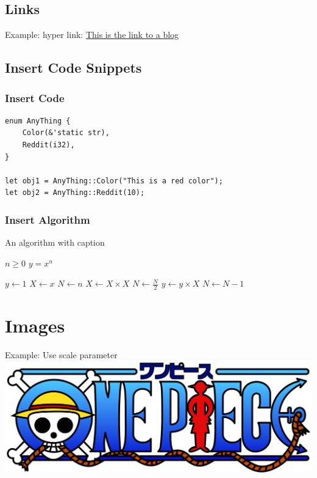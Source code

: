\documentclass[letterpaper, oneside]{book}
\begin{document}
	\section{Links}

	Example: hyper link:  \href{https://news.ycombinator.com/news}{This is the link to a blog}

\section{Insert Code Snippets}

\subsection{Insert Code}

\begin{lstlisting}
enum AnyThing {
    Color(&'static str),
    Reddit(i32),
}

let obj1 = AnyThing::Color("This is a red color");
let obj2 = AnyThing::Reddit(10);

\end{lstlisting}

\subsection{Insert Algorithm}

\begin{algorithm}
	\caption{An algorithm with caption}\label{alg:cap}

	\begin{algorithmic}[1]
		\Require $n \geq 0$
		\Ensure $y = x^n$

		\State $y \gets 1$
		\State $X \gets x$
		\State $N \gets n$
		\State $X \gets X \times X$
		\State $N \gets \frac{N}{2}$  
		\State $y \gets y \times X$
		\State $N \gets N - 1$
		\EndIf
		\EndWhile


	\end{algorithmic}
\end{algorithm}



	\chapter{Images}
	Example: Use scale parameter \\
	\includegraphics[scale=0.6]{One_Piece_Logo.png}
\end{document}
